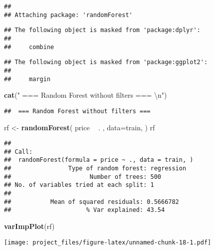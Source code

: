 \documentclass[
]{article}
\newenvironment{Shaded}{\begin{snugshade}}{\end{snugshade}}
\newcommand{\CharTok}[1]{\textcolor[rgb]{0.31,0.60,0.02}{#1}}
\newcommand{\DataTypeTok}[1]{\textcolor[rgb]{0.13,0.29,0.53}{#1}}
\newcommand{\KeywordTok}[1]{\textcolor[rgb]{0.13,0.29,0.53}{\textbf{#1}}}
\newcommand{\NormalTok}[1]{#1}
\newcommand{\OperatorTok}[1]{\textcolor[rgb]{0.81,0.36,0.00}{\textbf{#1}}}
\newcommand{\StringTok}[1]{\textcolor[rgb]{0.31,0.60,0.02}{#1}}
\begin{document}
\begin{verbatim}
## 
## Attaching package: 'randomForest'
\end{verbatim}

\begin{verbatim}
## The following object is masked from 'package:dplyr':
## 
##     combine
\end{verbatim}

\begin{verbatim}
## The following object is masked from 'package:ggplot2':
## 
##     margin
\end{verbatim}

\begin{Shaded}
\begin{Highlighting}[]
\KeywordTok{cat}\NormalTok{(}\StringTok{" === Random Forest without filters === }\CharTok{\textbackslash{}n}\StringTok{"}\NormalTok{)}
\end{Highlighting}
\end{Shaded}

\begin{verbatim}
##  === Random Forest without filters ===
\end{verbatim}

\begin{Shaded}
\begin{Highlighting}[]
\NormalTok{rf <-}\StringTok{ }\KeywordTok{randomForest}\NormalTok{(}
\NormalTok{  price }\OperatorTok{~}\StringTok{ }\NormalTok{. ,}
  \DataTypeTok{data=}\NormalTok{train,}
\NormalTok{)}
\NormalTok{rf}
\end{Highlighting}
\end{Shaded}

\begin{verbatim}
## 
## Call:
##  randomForest(formula = price ~ ., data = train, ) 
##                Type of random forest: regression
##                      Number of trees: 500
## No. of variables tried at each split: 1
## 
##           Mean of squared residuals: 0.5666782
##                     % Var explained: 43.54
\end{verbatim}

\begin{Shaded}
\begin{Highlighting}[]
\KeywordTok{varImpPlot}\NormalTok{(rf)}
\end{Highlighting}
\end{Shaded}

\texttt{[image: project\_files/figure-latex/unnamed-chunk-18-1.pdf]}
\end{document}
